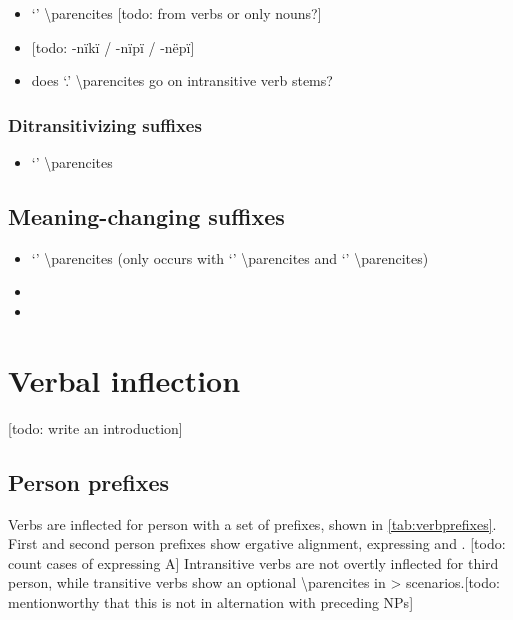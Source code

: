 \documentclass{memoir}
\begin{document}
\begin{itemize}
\tightlist
\item
   `' \textbackslash parencites {[}todo: from verbs or
  only nouns?{]}
\item
  {[}todo: -nïkï / -nïpï / -nëpï{]}
\item
  does  `.' \textbackslash parencites go on
  intransitive verb stems?
\end{itemize}

\subsection{\texorpdfstring{Ditransitivizing suffixes
\label{sec:ditrz}}{Ditransitivizing suffixes }}

\begin{itemize}
\tightlist
\item
   `' \textbackslash parencites
\end{itemize}

\section{\texorpdfstring{Meaning-changing suffixes
\label{sec:meaningderiv}}{Meaning-changing suffixes }}

\begin{itemize}
\item
   `' \textbackslash parencites (only occurs with
   `' \textbackslash parencites and 
  `' \textbackslash parencites)
\item
\item
\end{itemize}

\chapter{\texorpdfstring{Verbal inflection
\label{verbinfl}}{Verbal inflection }}

{[}todo: write an introduction{]}

\section{\texorpdfstring{Person prefixes
\label{sec:verbperson}}{Person prefixes }}

Verbs are inflected for person with a set of prefixes, shown in
\cref{tab:verbprefixes}. First and second person prefixes show ergative
alignment, expressing  and . {[}todo: count cases of
expressing A{]} Intransitive verbs are not overtly inflected for third
person, while transitive verbs show an optional 
\textbackslash parencites in \textgreater{}
scenarios.{[}todo: mentionworthy that this is not in alternation with
preceding NPs{]}
\end{document}
